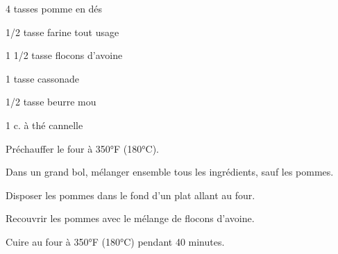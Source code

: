 


\totaltime{}


\begin{ingredients}
    \item 4 tasses pomme en dés
    \item 1/2 tasse farine tout usage
    \item 1 1/2 tasse flocons d'avoine
    \item 1 tasse cassonade
    \item 1/2 tasse beurre mou
    \item 1 c. à thé cannelle
\end{ingredients}

\begin{steps}
    \item Préchauffer le four à 350°F (180°C).
    \item Dans un grand bol, mélanger ensemble tous les ingrédients, sauf les pommes.
    \item Disposer les pommes dans le fond d'un plat allant au four.
    \item Recouvrir les pommes avec le mélange de flocons d'avoine.
    \item Cuire au four à 350°F (180°C) pendant 40 minutes.
\end{steps}
